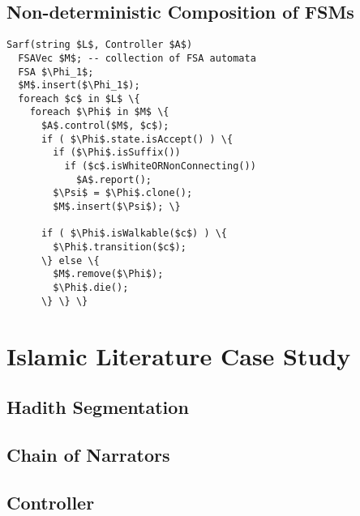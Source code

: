 \documentclass[11pt,letterpaper]{article}
\begin{document}
\subsection{Non-deterministic Composition of FSMs}
\label{sec:ndfsa}

\begin{figure*}[tb]
\end{figure*}


\begin{Verbatim}[fontsize=\relsize{-1},
frame=topline,framesep=4mm,label=\fbox{NDFSA Sarf algorithm},
commandchars=\\\{\}, codes={\catcode`$=3\catcode`_=8}]
Sarf(string $L$, Controller $A$) 
  FSAVec $M$; -- collection of FSA automata
  FSA $\Phi_1$;
  $M$.insert($\Phi_1$);
  foreach $c$ in $L$ \{
    foreach $\Phi$ in $M$ \{
      $A$.control($M$, $c$);
      if ( $\Phi$.state.isAccept() ) \{
        if ($\Phi$.isSuffix())
          if ($c$.isWhiteORNonConnecting())
            $A$.report();
        $\Psi$ = $\Phi$.clone();
        $M$.insert($\Psi$); \}

      if ( $\Phi$.isWalkable($c$) ) \{
        $\Phi$.transition($c$);
      \} else \{
        $M$.remove($\Phi$);
        $\Phi$.die();
      \} \} \}
\end{Verbatim}

\section{Islamic Literature Case Study}

\subsection{Hadith Segmentation}

\subsection{Chain of Narrators} 

\subsection{Controller}
\end{document}
